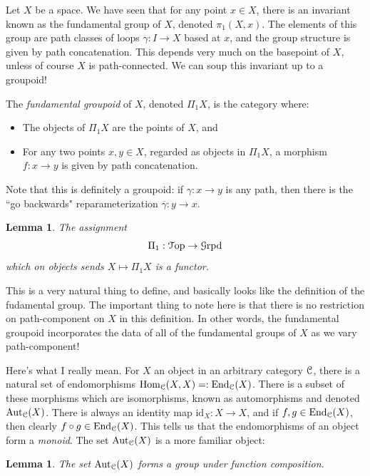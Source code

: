 \documentclass[10pt]{amsart}
\newcommand{\euscr}[1]{\EuScript{#1}}
\newtheorem{lemma}[thm]{Lemma}
\theoremstyle{definition}
\newcommand{\cdef}[1]{\textcolor{Bittersweet}{#1}}
\begin{document}
Let $X$ be a space. We have seen that for any point $x \in X$, there is an invariant known as the fundamental group of $X$, denoted $\pi_1(X, x)$. The elements of this group are path classes of loops $\gamma:I \to X$ based at $x$, and the group structure is given by path concatenation. This depends very much on the basepoint of $X$, unless of course $X$ is path-connected. We can soup this invariant up to a groupoid! 

The \cdef{\emph{fundamental groupoid}} of $X$, denoted $\Pi_1X$, is the category where:
\begin{itemize}
    \item The objects of $\Pi_1X$ are the points of $X$, and
    \item For any two points $x, y \in X$, regarded as objects in $\Pi_1X$, a morphism $f:x \to y$ is given by path concatenation.
\end{itemize}
Note that this is definitely a groupoid: if $\gamma:x \to y$ is any path, then there is the ``go backwards" reparameterization $\overline{\gamma}:y \to x$.
\begin{lemma}
    The assignment
    \[\Pi_1:\euscr{T}\mathrm{op} \to \euscr{G}\mathrm{rpd}\]
    which on objects sends $X \mapsto \Pi_1X$ is a functor.
\end{lemma}

This is a very natural thing to define, and basically looks like the definition of the fudamental group. The important thing to note here is that there is no restriction on path-component on $X$ in this definition. In other words, the fundamental groupoid incorporates the data of all of the fundamental groups of $X$ as we vary path-component! 

Here's what I really mean. For $X$ an object in an arbitrary category $\euscr{C}$, there is a natural set of endomorphisms $\text{Hom}_{\euscr{C}}(X, X) =: \text{End}_{\euscr{C}}(X)$. There is a subset of these morphisms which are isomorphisms, known as automorphisms and denoted $\text{Aut}_{\euscr{C}}(X)$. There is always an identity map $\text{id}_X:X \to X$, and if $f, g \in \text{End}_{\euscr{C}}(X)$, then clearly $f \circ g \in \text{End}_{\euscr{C}}(X)$. This tells us that the endomorphisms of an object form a \cdef{\emph{monoid}}. The set $\text{Aut}_{\euscr{C}}(X)$ is a more familiar object:

\begin{lemma}
    The set $\mathrm{Aut}_\euscr{C}(X)$ forms a group under function composition.
\end{lemma}
\end{document}
